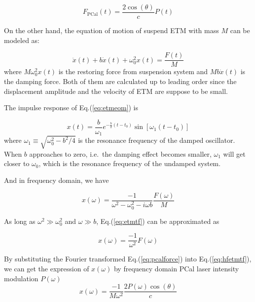 \begin{equation}
\label{eq:pcalforce}
    F_\text{PCal}(t) = \frac{ 2 \cos(\theta) }{c} P(t) 
\end{equation}


On the other hand, the equation of motion of suspend ETM with mass $M$ can be modeled as:

\begin{equation}
\label{eq:etmeom}
    \ddot{x}(t) + b \dot{x}(t) + \omega_0^2 x(t) = \frac{F(t)}{M} 
\end{equation}
where $M \omega_0^2 x(t)$ is the restoring force from suspension system and $M b\dot{x}(t)$ is the damping force. Both of them are calculated up to leading order since the displacement amplitude and the velocity of ETM are suppose to be small. 


%


The impulse response of Eq.(\ref{eq:etmeom}) is

\begin{equation}
    x(t)=\frac{b}{\omega_1}e^{-\frac{b}{2}(t-t_0)}\sin[\omega_1 (t-t_0)]
\end{equation}
where $\omega_1 \equiv \sqrt{\omega_0^2 - b^2/4}$ is the resonance frequency of the damped oscillator. When $b$ approaches to zero, i.e.~the damping effect becomes smaller, $\omega_1$ will get closer to $\omega_0$, which is the resonance frequency of the undamped system.


And in frequency domain, we have

\begin{equation}
\label{eq:etmtf}
   x(\omega)=\frac{-1}{\omega^2 - \omega_0^2 - i \omega b} \frac{F(\omega)}{M}
\end{equation}

As long as $\omega^2 \gg \omega_0^2$ and $\omega \gg b$, Eq.(\ref{eq:etmtf}) can be approximated as

\begin{equation}
\label{eq:hfetmtf}
   x(\omega)=\frac{-1}{\omega^2}F(\omega)
\end{equation}

By substituting the Fourier transformed Eq.({\ref{eq:pcalforce}}) into Eq.({\ref{eq:hfetmtf}}), we can get the expression of $x(\omega)$ by frequency domain PCal laser intensity modulation $P(\omega)$
\begin{equation}
\label{eq:pcaldisp}
    x(\omega) = \frac{-1}{M \omega^2} \frac{2  P(\omega) \cos(\theta)}{c} 
\end{equation}



